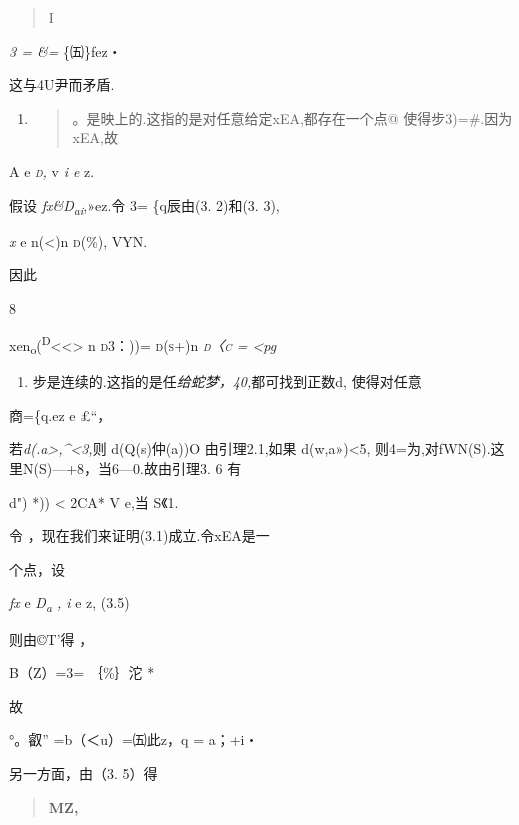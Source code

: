\documentclass{article}
\begin{document}
\begin{quote}
I
\end{quote}

\emph{3 = \&=} \{㈤\}fez・

这与4U尹而矛盾.

\begin{enumerate}
\def\labelenumi{\arabic{enumi}.}
\setcounter{enumi}{1}
\item
  \begin{quote}
  。是映上的.这指的是对任意给定xEA,都存在一个点@ 使得步3)=\#.因为xEA,故
  \end{quote}
\end{enumerate}

A e \emph{\textsc{d,}} v \emph{i e} z.

假设 \emph{fx\&D\textsubscript{ai}},»ez.令 3= \{q辰由(3. 2)和(3. 3),

\emph{x} e n(\textless{})n \textsc{d(\%),} VYN.

因此

8

xen\textsubscript{o}(\textsuperscript{D}\textless{}\textless{}\textgreater{}
n \textsc{d3：))= d(s+)}n \emph{\textsc{d〈c} = \textless{}pg}

\begin{enumerate}
\def\labelenumi{\arabic{enumi}.}
\setcounter{enumi}{2}
\item
  步是连续的.这指的是任\emph{给蛇梦，40,}都可找到正数d, 使得对任意
\end{enumerate}

商=\{q.ez e £``，

若\emph{d(.a\textgreater{},\^{}\textless{}3,}则 d(Q(s)仲(a))O
由引理2.1,如果 d(w,a»)\textless{}5,
则4=为,对\textbar{}f\textbar{}WN(S).这里N(S)---+8，当6---0.故由引理3. 6
有

d") *)) \textless{} 2CA* V e,当 S《1.

令 ，现在我们来证明(3.1)成立.令xEA是一

个点，设

\emph{fx} e \emph{D\textsubscript{a} , i} e z, (3.5)

则由©T'得 ，

B（Z）=3= ｛\%｝沱 *

故

°。叡'' =b（＜u）=㈤此z，q = a；+i・

另一方面，由（3. 5）得

\begin{quote}
\textbf{MZ,}
\end{quote}
\end{document}
